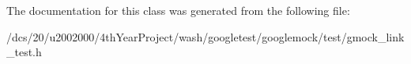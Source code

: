 The documentation for this class was generated from the following file\+:\begin{DoxyCompactItemize}
\item 
/dcs/20/u2002000/4th\+Year\+Project/wash/googletest/googlemock/test/gmock\+\_\+link\+\_\+test.\+h\end{DoxyCompactItemize}
